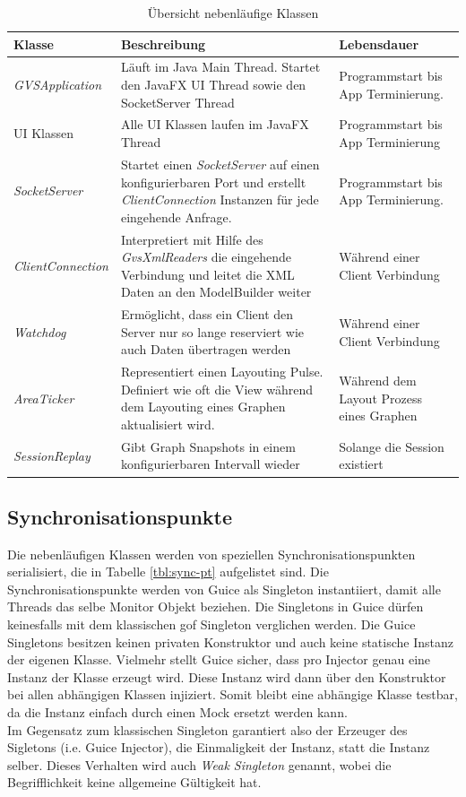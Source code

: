 \documentclass[11pt,a4paper,english,oneside]{book}
\numberwithin{equation}{chapter}
\begin{document}
	\begin{table}[h!]
		\centering
		\begin{tabularx}{\linewidth}{l X X}
			\toprule 
			Klasse & Beschreibung & Lebensdauer \\
			\midrule
			\textit{GVSApplication} & Läuft im Java Main Thread. Startet den JavaFX UI Thread sowie den SocketServer Thread & Programmstart bis App Terminierung. \\
			UI Klassen & Alle UI Klassen laufen im JavaFX Thread & Programmstart bis App Terminierung \\
			\textit{SocketServer} & Startet einen \textit{SocketServer} auf einen konfigurierbaren Port und erstellt \textit{ClientConnection} Instanzen für jede eingehende Anfrage. & Programmstart bis App Terminierung. \\
			\textit{ClientConnection} & Interpretiert mit Hilfe des \textit{GvsXmlReaders} die eingehende Verbindung und leitet die XML Daten an den ModelBuilder weiter & Während einer Client Verbindung \\
			\textit{Watchdog} & Ermöglicht, dass ein Client den Server nur so lange reserviert wie auch Daten übertragen werden & Während einer Client Verbindung \\
			\textit{AreaTicker} & Representiert einen Layouting Pulse. Definiert wie oft die View während dem Layouting eines Graphen aktualisiert wird. & Während dem Layout Prozess eines Graphen \\
			\textit{SessionReplay} & Gibt Graph Snapshots in einem konfigurierbaren Intervall wieder & Solange die Session existiert \\
			\bottomrule 
		\end{tabularx} 
		\caption{Übersicht nebenläufige Klassen} 
		\label{tbl:concurrent-classes}
	\end{table}
	
	\subsection{Synchronisationspunkte}
	
	Die nebenläufigen Klassen werden von speziellen Synchronisationspunkten serialisiert, die in Tabelle \ref{tbl:sync-pt} aufgelistet sind. Die Synchronisationspunkte werden von Guice \cite{guice} als Singleton instantiiert, damit alle Threads das selbe Monitor Objekt beziehen. Die Singletons in Guice dürfen keinesfalls mit dem klassischen \gls{gof} Singleton verglichen werden. Die Guice Singletons besitzen keinen privaten Konstruktor und auch keine statische Instanz der eigenen Klasse. Vielmehr stellt Guice sicher, dass pro Injector genau eine Instanz der Klasse erzeugt wird. Diese Instanz wird dann über den Konstruktor bei allen abhängigen Klassen injiziert. Somit bleibt eine abhängige Klasse testbar, da die Instanz einfach durch einen Mock ersetzt werden kann. \\
	\noindent
	Im Gegensatz zum klassischen Singleton garantiert also der Erzeuger des Sigletons (i.e. Guice Injector), die Einmaligkeit der Instanz, statt die Instanz selber. Dieses Verhalten wird auch \textit{Weak Singleton} genannt, wobei die Begrifflichkeit keine allgemeine Gültigkeit hat.
	
\end{document}

